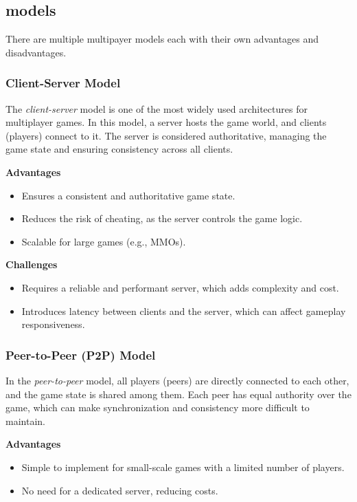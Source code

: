 \documentclass{article} %
\begin{document}
\subsection{models}
There are multiple multipayer models each with their own advantages and disadvantages.

\subsubsection{Client-Server Model}
The \textit{client-server} model is one of the most widely used architectures for multiplayer games. In this model, a server hosts the game world, and clients (players) connect to it. The server is considered authoritative, managing the game state and ensuring consistency across all clients.

\textbf{Advantages}
\begin{itemize}
    \item Ensures a consistent and authoritative game state.
    \item Reduces the risk of cheating, as the server controls the game logic.
    \item Scalable for large games (e.g., MMOs).
\end{itemize}

\textbf{Challenges}
\begin{itemize}
    \item Requires a reliable and performant server, which adds complexity and cost.
    \item Introduces latency between clients and the server, which can affect gameplay responsiveness.
\end{itemize}

\subsubsection{Peer-to-Peer (P2P) Model}
In the \textit{peer-to-peer} model, all players (peers) are directly connected to each other, and the game state is shared among them. Each peer has equal authority over the game, which can make synchronization and consistency more difficult to maintain.

\textbf{Advantages}
\begin{itemize}
    \item Simple to implement for small-scale games with a limited number of players.
    \item No need for a dedicated server, reducing costs.
\end{itemize}
\end{document}
